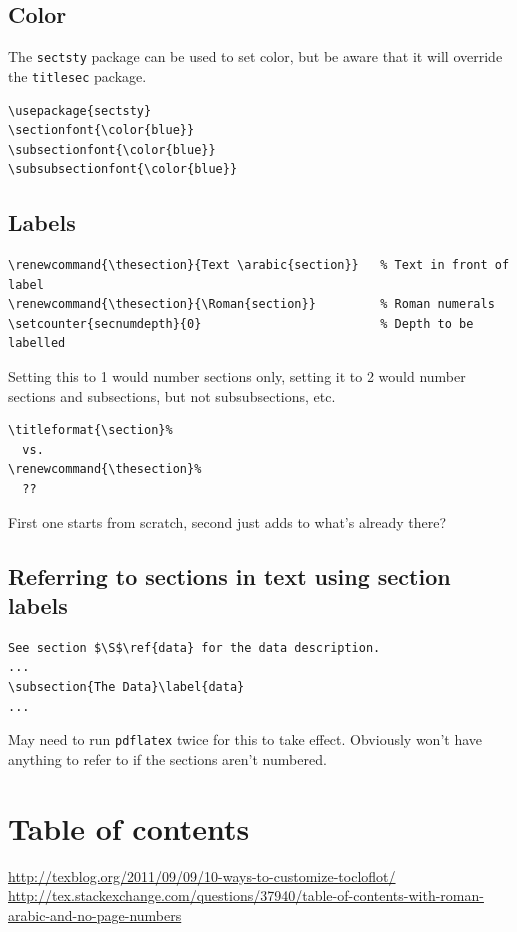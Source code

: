 \documentclass{article}
\begin{document}
\subsection{Color}
The \verb|sectsty| package can be used to set color, but be aware that it will
override the \verb|titlesec| package.
\begin{lstlisting}
\usepackage{sectsty}
\sectionfont{\color{blue}}
\subsectionfont{\color{blue}}
\subsubsectionfont{\color{blue}}
\end{lstlisting}

\subsection{Labels}
\begin{lstlisting}
\renewcommand{\thesection}{Text \arabic{section}}   % Text in front of label
\renewcommand{\thesection}{\Roman{section}}         % Roman numerals
\setcounter{secnumdepth}{0}                         % Depth to be labelled
\end{lstlisting}
Setting this to 1 would number sections only, setting it to 2 would
number sections and subsections, but not subsubsections, etc.



\begin{lstlisting}
\titleformat{\section}%
  vs.
\renewcommand{\thesection}%
  ??
\end{lstlisting}
First one starts from scratch, second just adds to what's already there?

\subsection{Referring to sections in text using section labels}
\begin{verbatim}
See section $\S$\ref{data} for the data description.
...
\subsection{The Data}\label{data}
...
\end{verbatim}
May need to run \texttt{pdflatex} twice for this to take effect.
Obviously won't have anything to refer to if the sections aren't numbered.

\newpage
\section{Table of contents}
\url{http://texblog.org/2011/09/09/10-ways-to-customize-tocloflot/}
\url{http://tex.stackexchange.com/questions/37940/table-of-contents-with-roman-arabic-and-no-page-numbers}
\end{document}
